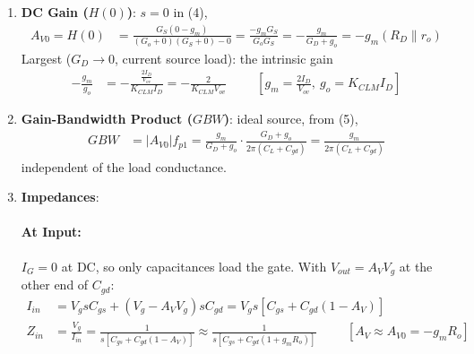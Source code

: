 \begin{enumerate}
\begin{align*}
    \end{align*}
  \item \textbf{DC Gain (\(H(0)\))}: \(s = 0\) in (4),
    \begin{align*}
      A_{V0} = H(0) &= \frac{G_S (0 - g_m)}{(G_o + 0)(G_S + 0) - 0} = \frac{-g_m G_S}{G_o G_S} = -\frac{g_m}{G_D + g_o} = -g_m (R_D \parallel r_o)
    \end{align*}
    Largest (\(G_D \to 0\), current source load): the intrinsic gain
    \begin{align*}
      -\frac{g_m}{g_o} &= -\frac{\frac{2 I_D}{V_{ov}}}{K_{CLM} I_D} = -\frac{2}{K_{CLM} V_{ov}} \hspace{1cm} \left[g_m = \tfrac{2 I_D}{V_{ov}},\ g_o = K_{CLM} I_D\right]
    \end{align*}
  \item \textbf{Gain-Bandwidth Product (\(GBW\))}: ideal source, from (5),
    \begin{align*}
      GBW &= |A_{V0}| f_{p1} = \frac{g_m}{G_D + g_o} \cdot \frac{G_D + g_o}{2\pi(C_L + C_{gd})} = \frac{g_m}{2\pi (C_L + C_{gd})}
    \end{align*}
    independent of the load conductance.
  \item \textbf{Impedances}:
    \paragraph{At Input:} \(I_G = 0\) at DC, so only capacitances load the gate. With
    \(V_{out} = A_V V_g\) at the other end of \(C_{gd}\):
    \begin{align*}
      I_{in} &= V_g sC_{gs} + (V_g - A_V V_g) sC_{gd} = V_g s\left[C_{gs} + C_{gd}(1 - A_V)\right] \\
      Z_{in} &= \frac{V_g}{I_{in}} = \frac{1}{s\left[C_{gs} + C_{gd}(1 - A_V)\right]} \approx \frac{1}{s\left[C_{gs} + C_{gd}(1 + g_m R_o)\right]} \hspace{1cm} [A_V \approx A_{V0} = -g_m R_o]
    \end{align*}

\end{enumerate}
